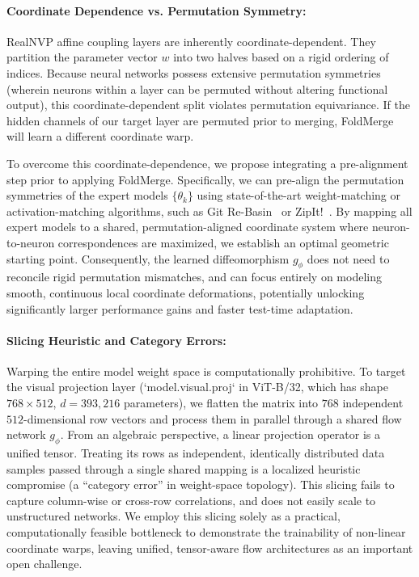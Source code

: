 \paragraph{Coordinate Dependence vs. Permutation Symmetry:}
RealNVP affine coupling layers are inherently coordinate-dependent. 
They partition the parameter vector $w$ into two halves based on a rigid ordering of indices. 
Because neural networks possess extensive permutation symmetries (wherein neurons within a layer can be permuted without altering functional output), this coordinate-dependent split violates permutation equivariance. 
If the hidden channels of our target layer are permuted prior to merging, FoldMerge will learn a different coordinate warp. 

To overcome this coordinate-dependence, we propose integrating a pre-alignment step prior to applying FoldMerge. Specifically, we can pre-align the permutation symmetries of the expert models $\{ \theta_k \}$ using state-of-the-art weight-matching or activation-matching algorithms, such as Git Re-Basin~\cite{ainsworth2022gitrebasin} or ZipIt!~\cite{stoica2023zipit}. By mapping all expert models to a shared, permutation-aligned coordinate system where neuron-to-neuron correspondences are maximized, we establish an optimal geometric starting point. Consequently, the learned diffeomorphism $g_\phi$ does not need to reconcile rigid permutation mismatches, and can focus entirely on modeling smooth, continuous local coordinate deformations, potentially unlocking significantly larger performance gains and faster test-time adaptation.

\paragraph{Slicing Heuristic and Category Errors:}
Warping the entire model weight space is computationally prohibitive. 
To target the visual projection layer (`model.visual.proj` in ViT-B/32, which has shape $768 \times 512$, $d = 393,216$ parameters), we flatten the matrix into $768$ independent $512$-dimensional row vectors and process them in parallel through a shared flow network $g_\phi$. 
From an algebraic perspective, a linear projection operator is a unified tensor. 
Treating its rows as independent, identically distributed data samples passed through a single shared mapping is a localized heuristic compromise (a ``category error'' in weight-space topology). 
This slicing fails to capture column-wise or cross-row correlations, and does not easily scale to unstructured networks. 
We employ this slicing solely as a practical, computationally feasible bottleneck to demonstrate the trainability of non-linear coordinate warps, leaving unified, tensor-aware flow architectures as an important open challenge.
